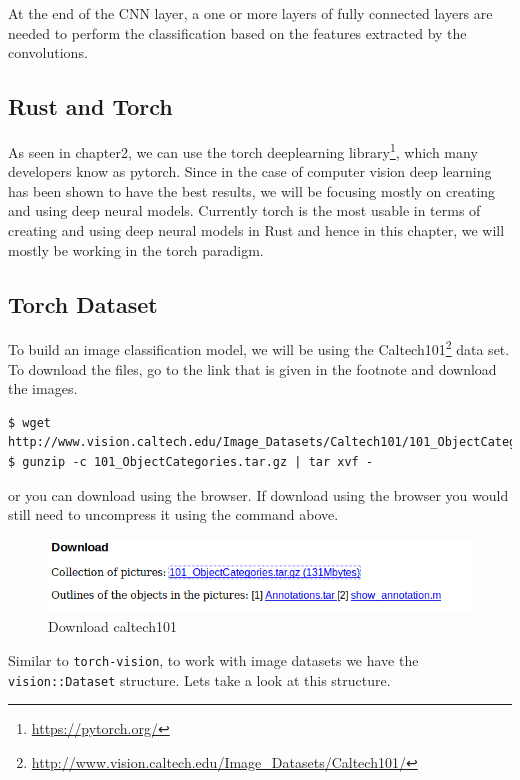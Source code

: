 \documentclass{book}
\begin{document}
At the end of the CNN layer, a one or more layers of fully connected layers are needed to perform the classification based on the features extracted by the convolutions.

\subsection{Rust and Torch}%
As seen in chapter2, we can use the torch deeplearning library\footnote{\href{}{https://pytorch.org/}}, which many developers know as pytorch. Since in the case of computer vision deep learning has been shown to have the best results, we will be focusing mostly on creating and using deep neural models. Currently torch is the most usable in terms of creating and using deep neural models in Rust and hence in this chapter, we will mostly be working in the torch paradigm.
\label{sub:rust_and_torch}

\subsection{Torch Dataset}%
To build an image classification model, we will be using the Caltech101\footnote{\href{}{http://www.vision.caltech.edu/Image\_Datasets/Caltech101/}} data set. To download the files, go to the link that is given in the footnote and download the images.

\begin{lstlisting}[caption={download images}, basicstyle=\tiny]
$ wget http://www.vision.caltech.edu/Image_Datasets/Caltech101/101_ObjectCategories.tar.gz
$ gunzip -c 101_ObjectCategories.tar.gz | tar xvf -
\end{lstlisting}

or you can download using the browser. If download using the browser you would still need to uncompress it using the command above.

\begin{figure}[htpb]
	\centering
	\includegraphics[width=0.8\linewidth]{Figures/downloadcaltech101.png}
	\caption{Download caltech101}
	\label{fig:Figures/downloadcaltech101}
\end{figure}

Similar to \lstinline{torch-vision}, to work with image datasets we have the \lstinline{vision::Dataset} structure. Lets take a look at this structure.
\end{document}
